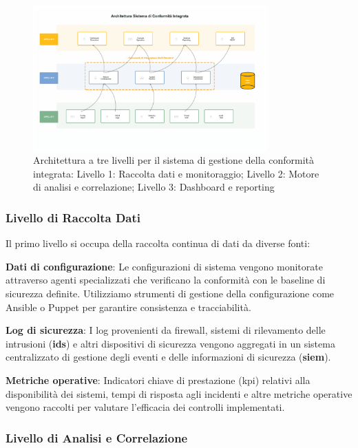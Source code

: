 \begin{figure}[htbp]
\centering
\includegraphics[width=0.8\textwidth]{thesis_figures/cap4/figura_4_2_architettura_premium.pdf}
\caption[Architettura a tre livelli per la conformità integrata]{Architettura a tre livelli per il sistema di gestione della conformità integrata: Livello 1: Raccolta dati e monitoraggio; Livello 2: Motore di analisi e correlazione; Livello 3: Dashboard e reporting}
\label{fig:architettura_sistema}
\end{figure}

\subsubsection{\texorpdfstring{Livello di Raccolta Dati}{4.3.2.1 - Livello di Raccolta Dati}}

Il primo livello si occupa della raccolta continua di dati da diverse fonti:

\textbf{Dati di configurazione}: Le configurazioni di sistema vengono monitorate attraverso agenti specializzati che verificano la conformità con le baseline di sicurezza definite. Utilizziamo strumenti di gestione della configurazione come Ansible o Puppet per garantire consistenza e tracciabilità.

\textbf{Log di sicurezza}: I log provenienti da firewall, sistemi di rilevamento delle intrusioni (\textbf{\gls{ids}}) e altri dispositivi di sicurezza vengono aggregati in un sistema centralizzato di gestione degli eventi e delle informazioni di sicurezza (\textbf{\gls{siem}}).

\textbf{Metriche operative}: Indicatori chiave di prestazione (\gls{kpi}) relativi alla disponibilità dei sistemi, tempi di risposta agli incidenti e altre metriche operative vengono raccolti per valutare l'efficacia dei controlli implementati.

\subsubsection{\texorpdfstring{Livello di Analisi e Correlazione}{4.3.2.2 - Livello di Analisi e Correlazione}}

